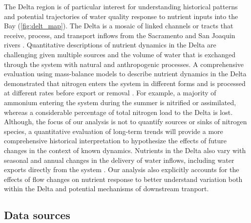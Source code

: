 \documentclass[journal = esthag, manuscript = article]{achemso}\usepackage[]{graphicx}\usepackage[]{color}
\begin{document}
The Delta region is of particular interest for understanding historical patterns and potential trajectories of water quality response to nutrient inputs into the Bay (\cref{fig:delt_map}).  The Delta is a mosaic of linked channels or tracts that receive, process, and transport inflows from the Sacramento and San Joaquin rivers \cite{Jassby00,Jassby08,Novick15}.  Quantitative descriptions of nutrient dynamics in the Delta are challenging given multiple sources and the volume of water that is exchanged through the system with natural and anthropogenic processes.  A comprehensive evaluation using mass-balance models to describe nutrient dynamics in the Delta demonstrated that nitrogen enters the system in different forms and is processed at different rates before export or removal \cite{Novick15}. For example, a majority of ammonium entering the system during the summer is nitrified or assimilated, whereas a considerable percentage of total nitrogen load to the Delta is lost.  Although, the focus of our analysis is not to quantify sources or sinks of nitrogen species, a quantitative evaluation of long-term trends will provide a more comprehensive historical interpretation to hypothesize the effects of future changes in the context of known dynamics.  Nutrients in the Delta also vary with seasonal and annual changes in the delivery of water inflows, including water exports directly from the system \cite{Jassby00,Jassby08}.  Our analysis also explicitly accounts for the effects of flow changes on nutrient response to better understand variation both within the Delta and potential mechanisms of downstream tranport. 

\subsection{Data sources}

\end{document}
